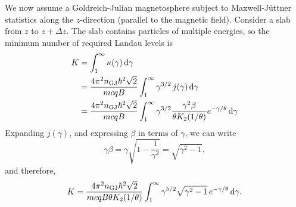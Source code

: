 \documentclass{book}
\newcommand{\nGJ}{n_{\rm GJ}}
\begin{document}
We now assume a Goldreich-Julian magnetosphere subject to Maxwell-J\"uttner statistics along the $z$-direction (parallel to the magnetic field).
Consider a slab from $z$ to $z + \Delta z$.
The slab contains particles of multiple energies, so the minimum number of required Landau levels is
\begin{equation}
  \begin{aligned}
    K &= \int_1^\infty \kappa(\gamma)\,{\rm d}\gamma \\
      &= \frac{4\pi^2 \nGJ \hbar^2 \sqrt{2}}{mcqB} \int_1^\infty \gamma^{3/2}\,j(\gamma)\,{\rm d}\gamma \\
      &= \frac{4\pi^2 \nGJ \hbar^2 \sqrt{2}}{mcqB} \int_1^\infty \gamma^{3/2} \frac{\gamma^2\beta}{\theta K_2(1/\theta)} e^{-\gamma/\theta}\,{\rm d}\gamma
  \end{aligned}
\end{equation}
Expanding $j(\gamma)$, and expressing $\beta$ in terms of $\gamma$, we can write
\begin{equation}
  \gamma\beta = \gamma\sqrt{1 - \frac{1}{\gamma^2}} = \sqrt{\gamma^2 - 1},
\end{equation}
and therefore,
\begin{equation}
  K = \frac{4\pi^2 \nGJ \hbar^2 \sqrt{2}}{mcqB \theta K_2(1/\theta)} \int_1^\infty \gamma^{5/2}\sqrt{\gamma^2 - 1} \, e^{-\gamma/\theta} \, {\rm d}\gamma.
\end{equation}
\end{document}
